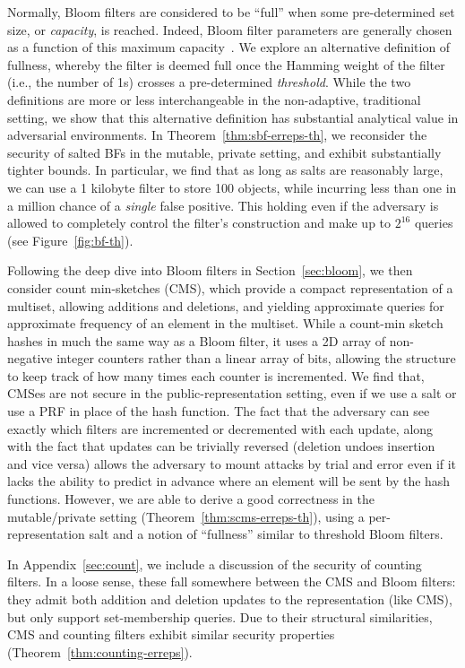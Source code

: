 Normally, Bloom filters are considered to be ``full'' when some
pre-determined set size, or
\emph{capacity}, is reached.  Indeed, Bloom filter parameters are generally chosen
as a function of this maximum capacity~\cite{kirsch2006less}.
%
We explore an alternative definition of fullness, whereby the filter is deemed full
once the Hamming weight of the filter (i.e., the number of 1s) crosses a
pre-determined \emph{threshold}.  While the two definitions are more or
less interchangeable in the non-adaptive, traditional setting, we show
that this alternative definition has substantial
analytical value in adversarial environments.  In
Theorem~\ref{thm:sbf-erreps-th}, we reconsider the security of salted
BFs in the mutable, private setting, and exhibit substantially tighter bounds. In
particular, we find that as long as salts are reasonably large, we can use
a 1 kilobyte filter to store 100 objects, while incurring less than one in a million
chance of a \emph{single} false positive.  This holding even if the adversary is allowed
to completely control the filter's construction and make up to $2^{16}$ queries
(see Figure~\ref{fig:bf-th}).


Following the deep dive into Bloom filters in Section~\ref{sec:bloom}, we then
consider count min-sketches (CMS), which provide a compact representation of a
multiset, allowing additions and deletions, and yielding approximate queries for
approximate frequency of an element in the multiset. While a count-min sketch
hashes in much the same way as a Bloom filter, it uses a 2D array of non-negative
integer counters rather than a linear array of bits, allowing the structure to
keep track of how many times each counter is incremented.
%
We find that, CMSes are not secure in the
public-representation setting, even if we use a salt or use a PRF in place of
the hash function. The fact that the adversary can see exactly which filters are
incremented or decremented with each update, along with the fact that updates can be
trivially reversed (deletion undoes insertion and vice versa) allows the
adversary to mount attacks by trial and error even if it lacks the ability to
predict in advance where an element will be sent by the hash functions.
%
However, we are able to derive a good correctness in the mutable/private setting
(Theorem~\ref{thm:scms-erreps-th}), using a per-representation salt and a
notion of ``fullness'' similar to threshold Bloom filters.

In Appendix~\ref{sec:count}, we include a discussion of the security
of counting filters.
%
In a loose sense, these fall somewhere between the CMS and Bloom
filters: they admit both addition and deletion
updates to the representation (like CMS), but only support set-membership queries.
%
Due to their structural similarities, CMS and counting filters
exhibit similar security properties (Theorem~\ref{thm:counting-erreps}).

